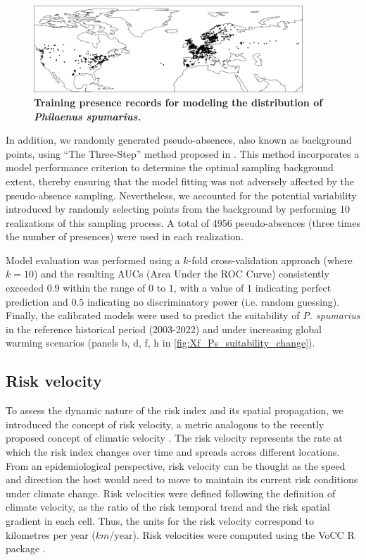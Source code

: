 \begin{figure}[ht]
    \centering
    \includegraphics[width=0.9\textwidth]{Figures/Ps_presence_map.pdf}
    \caption{\textbf{Training presence records for modeling the
            distribution of \textit{Philaenus spumarius.}}}
    \label{fig:Ps_presence_map}
\end{figure}

In addition, we randomly generated pseudo-absences, also known as
background points, using ``The Three-Step'' method proposed in
\cite{iturbide_framework_2015}. This method incorporates a model performance
criterion to determine the optimal sampling background extent, thereby ensuring
that the model fitting was not adversely affected by the pseudo-absence
sampling. Nevertheless, we accounted for the potential variability introduced
by randomly selecting points from the background by performing 10 realizations
of this sampling process. A total of 4956 pseudo-absences (three times the
number of presences) were used in each realization.

Model evaluation was performed using a $k$-fold cross-validation approach
(where $k = 10$) and the resulting AUCs (Area Under the ROC Curve) consistently
exceeded $0.9$ within the range of $0$ to $1$, with a value of $1$ indicating
perfect prediction and $0.5$ indicating no discriminatory power (i.e. random
guessing). Finally, the calibrated models were used to predict the suitability
of \textit{P. spumarius} in the reference historical period (2003-2022) and
under increasing global warming scenarios (panels b, d, f, h in
\cref{fig:Xf_Ps_suitability_change}).

\subsection{Risk velocity}

To assess the dynamic nature of the risk index and its spatial propagation,
we introduced the concept of risk velocity, a metric analogous to the recently
proposed concept of climatic velocity \cite{Loarie2009}. The risk velocity
represents the rate at which the risk index changes over time and spreads
across different locations. From an epidemiological perspective, risk velocity
can be thought as the speed and direction the host would need to move to
maintain its current risk conditions under climate change. Risk velocities were
defined following the definition of climate velocity, as the ratio of the risk
temporal trend and the risk spatial gradient in each cell. Thus, the units for
the risk velocity correspond to kilometres per year ($km/\mathrm{year}$). Risk
velocities were computed using the VoCC R package \cite{VoCC, VoCC_paper}.

